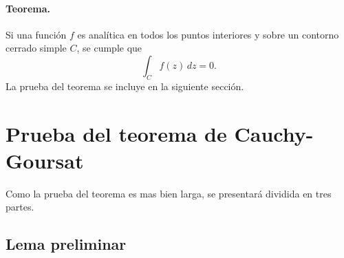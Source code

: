 \documentclass[a4paper]{report}
\begin{document}
\paragraph{Teorema.} Si una función \(f\) es analítica en todos los puntos interiores y sobre un contorno cerrado simple \(C\), se cumple que 
\begin{equation}\label{eq:cauchy_goursat_theorem}
 \int_C f(z)\,dz=0.  
\end{equation}
La prueba del teorema se incluye en la siguiente sección.

\section{Prueba del teorema de Cauchy-Goursat}\label{sec:cauchy_goursat_theorem_proof}

Como la prueba del teorema es mas bien larga, se presentará dividida en tres partes.

\subsection*{Lema preliminar}
\end{document}

